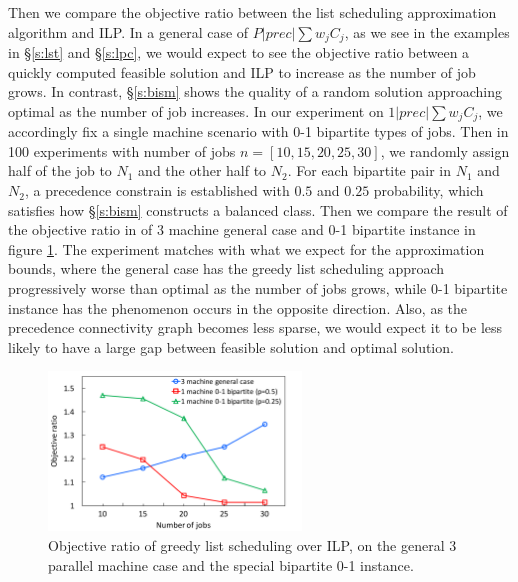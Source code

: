 Then we compare the objective ratio between the list scheduling approximation algorithm and ILP. In a general case of $P|prec|\sum w_j C_j$, as we see in the examples in \S\ref{s:lst} and \S\ref{s:lpc}, we would expect to see the objective ratio between a quickly computed feasible solution and ILP to increase as the number of job grows. In contrast, \S\ref{s:bism} shows the quality of a random solution approaching optimal as the number of job increases. In our experiment on $1|prec|\sum w_j C_j$, we accordingly fix a single machine scenario with 0-1 bipartite types of jobs. Then in 100 experiments with number of jobs $n = [10, 15, 20, 25, 30]$, we randomly assign half of the job to $N_1$ and the other half to $N_2$. For each bipartite pair in $N_1$ and $N_2$, a precedence constrain is established with $0.5$ and $0.25$ probability, which satisfies how \S\ref{s:bism} constructs a balanced class. Then we compare the result of the objective ratio in of 3 machine general case and 0-1 bipartite instance in figure \ref{fig:obj_ratio}. The experiment matches with what we expect for the approximation bounds, where the general case has the greedy list scheduling approach progressively worse than optimal as the number of jobs grows, while 0-1 bipartite instance has the phenomenon occurs in the opposite direction. Also, as the precedence connectivity graph becomes less sparse, we would expect it to be less likely to have a large gap between feasible solution and optimal solution.

\begin{figure}[h]
	\centering
	\includegraphics[width=0.6\textwidth]{figs/obj_ratio.pdf}
	\caption{Objective ratio of greedy list scheduling over ILP, on the general 3 parallel machine case and the special bipartite 0-1 instance.}
	\label{fig:obj_ratio}
\end{figure}
